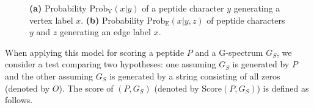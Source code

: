 \begin{figure*}[tbp]
\centering
{}
\caption{\footnotesize \textbf{(a)} Probability $\textrm{Prob}_{\textrm{V}}(x|y)$ of a peptide character
$y$ generating a vertex label $x$. 
\textbf{(b)} Probability $\textrm{Prob}_{\textrm{E}}(x|y,z)$ of peptide characters
$y$ and $z$ generating an edge label $x$. 
}
\label{ProbTable}
\end{figure*}

When applying this model for scoring a peptide $P$ and a G-spectrum $G_S$, we consider a test comparing two hypotheses: 
one assuming $G_S$ is generated by $P$ and the other assuming $G_S$ is generated by a string consisting of all zeros (denoted by $O$).
The score of $(P,G_S)$ (denoted by $\textrm{Score}(P,G_S)$) is defined as follows.


